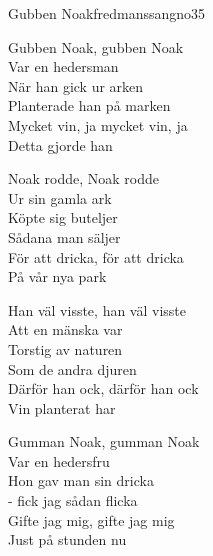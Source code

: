 \begin{song}{Gubben Noak}{fredmanssangno35}
\begin{vers}
Gubben Noak, gubben Noak\\
Var en hedersman\\
När han gick ur arken\\
Planterade han på marken\\
Mycket vin, ja mycket vin, ja\\
Detta gjorde han\\
\end{vers}
\begin{vers}
Noak rodde, Noak rodde\\
Ur sin gamla ark\\
Köpte sig buteljer\\
Sådana man säljer\\
För att dricka, för att dricka\\
På vår nya park\\
\end{vers}
\begin{vers}
Han väl visste, han väl visste\\
Att en mänska var\\
Torstig av naturen\\
Som de andra djuren\\
Därför han ock, därför han ock\\
Vin planterat har\\
\end{vers}
\newp
\begin{vers}
Gumman Noak, gumman Noak\\
Var en hedersfru\\
Hon gav man sin dricka\\
- fick jag sådan flicka\\
Gifte jag mig, gifte jag mig\\
Just på stunden nu\\
\end{vers}
\end{song}
